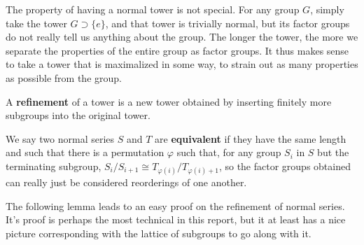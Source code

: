 The property of having a normal tower is not special. For any group $G$, simply take the tower $G \supset \{e\}$, and that tower is trivially normal, but its factor groups do not really tell us anything about the group. The longer the tower, the more we separate the properties of the entire group as factor groups. It thus makes sense to take a tower that is maximalized in some way, to strain out as many properties as possible from the group.

\begin{definition}
    A {\bf refinement} of a tower is a new tower obtained by inserting finitely more subgroups into the original tower.
\end{definition}

\begin{definition}
    We say two normal series $S$ and $T$ are {\bf equivalent}  if they have the same length and such that there is a permutation $\varphi$ such that, for any group $S_i$ in $S$ but the terminating subgroup, $S_i/S_{i+1} \cong T_{\varphi(i)}/T_{\varphi(i) + 1}$, so the factor groups obtained can really just be considered reorderings of one another.
\end{definition}

The following lemma leads to an easy proof on the refinement of normal series. It's proof is perhaps the most technical in this report, but it at least has a nice picture corresponding with the lattice of subgroups to go along with it.%

%

